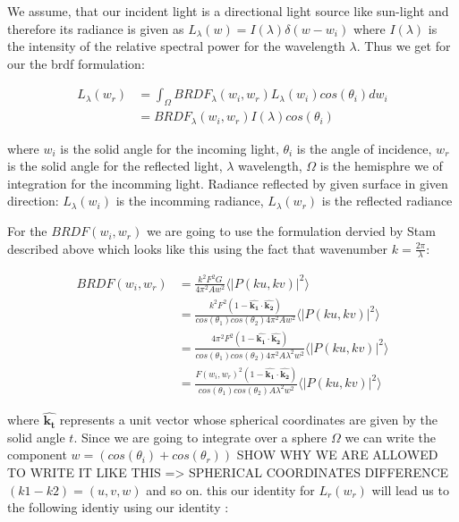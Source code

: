 We assume, that our incident light is a directional light source like sun-light and therefore its radiance is given as $L_{\lambda}(w)=I(\lambda)\delta(w-w_i)$ where $I(\lambda)$ is the intensity of the relative spectral power for the wavelength $\lambda$. Thus we get for our the brdf formulation:

\begin{align}
L_{\lambda}(w_r) 
& = \int_{\Omega} BRDF_{\lambda}(w_i, w_r) L_{\lambda}(w_i) cos(\theta_i) dw_i \\
& = BRDF_{\lambda}(w_i, w_r) I(\lambda) cos(\theta_i)
\end{align}

where $w_i$ is the solid angle for the incoming light, $\theta{_i}$ is the angle of incidence,
$w_r$ is the solid angle for the reflected light, $\lambda$ wavelength, $\Omega$ is the hemisphre we of integration for the incomming light.
Radiance reflected by given surface in given direction:
$L_{\lambda}(w_i)$ is the incomming radiance, $L_{\lambda}(w_r)$ is the reflected radiance

For the $BRDF(w_i, w_r)$ we are going to use the formulation dervied by Stam described above which looks like this using the fact that wavenumber $k=\frac{2\pi}{\lambda}$:

\begin{align*}
BRDF(w_i, w_r) 
& = \frac{k^2 F^2 G}{4\pi^2 A w^2} \langle \left|P(ku, kv) \right|^2\rangle \\
& = \frac{k^2 F^2 (1-\hat{\mathbf{k_1}}\cdot\hat{\mathbf{k_2}})}{cos(\theta_1)cos(\theta_2) 4\pi^2 A w^2} \langle \left|P(ku, kv)  \right|^2\rangle \\
& = \frac{4 \pi^2 F^2 (1-\hat{\mathbf{k_1}}\cdot\hat{\mathbf{k_2}})}{cos(\theta_1)cos(\theta_2) 4\pi^2 A \lambda^2 w^2} \langle \left|P(ku, kv)  \right|^2\rangle \\
& = \frac{F(w_i, w_r)^2 (1-\hat{\mathbf{k_1}}\cdot\hat{\mathbf{k_2}})}{cos(\theta_1)cos(\theta_2) A \lambda^2 w^2} \langle \left|P(ku, kv)  \right|^2\rangle
\end{align*}

where $\hat{\mathbf{k_t}}$ represents a unit vector whose spherical coordinates are given by the solid angle $t$.
Since we are going to integrate over a sphere $\Omega$ we can write the component $w=(cos(\theta_i)+cos(\theta_r))$
SHOW WHY WE ARE ALLOWED TO WRITE IT LIKE THIS => SPHERICAL COORDINATES DIFFERENCE $(k1 - k2) = (u,v,w)$ and so on.
this our identity for $L_{r}(w_r)$ will lead us to the following identiy using our identity :

